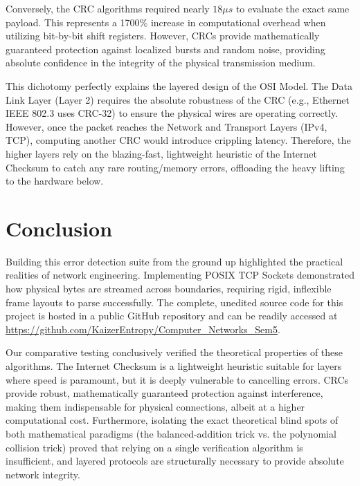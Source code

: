 \documentclass[12pt, a4paper]{article}
\begin{document}
Conversely, the CRC algorithms required nearly $18 \mu s$ to evaluate the exact same payload. This represents a 1700\% increase in computational overhead when utilizing bit-by-bit shift registers. However, CRCs provide mathematically guaranteed protection against localized bursts and random noise, providing absolute confidence in the integrity of the physical transmission medium. 

This dichotomy perfectly explains the layered design of the OSI Model. The Data Link Layer (Layer 2) requires the absolute robustness of the CRC (e.g., Ethernet IEEE 802.3 uses CRC-32) to ensure the physical wires are operating correctly. However, once the packet reaches the Network and Transport Layers (IPv4, TCP), computing another CRC would introduce crippling latency. Therefore, the higher layers rely on the blazing-fast, lightweight heuristic of the Internet Checksum to catch any rare routing/memory errors, offloading the heavy lifting to the hardware below.

\section{Conclusion}
Building this error detection suite from the ground up highlighted the practical realities of network engineering. Implementing POSIX TCP Sockets demonstrated how physical bytes are streamed across boundaries, requiring rigid, inflexible frame layouts to parse successfully. The complete, unedited source code for this project is hosted in a public GitHub repository and can be readily accessed at \url{https://github.com/KaizerEntropy/Computer_Networks_Sem5}.

Our comparative testing conclusively verified the theoretical properties of these algorithms. The Internet Checksum is a lightweight heuristic suitable for layers where speed is paramount, but it is deeply vulnerable to cancelling errors. CRCs provide robust, mathematically guaranteed protection against interference, making them indispensable for physical connections, albeit at a higher computational cost. Furthermore, isolating the exact theoretical blind spots of both mathematical paradigms (the balanced-addition trick vs. the polynomial collision trick) proved that relying on a single verification algorithm is insufficient, and layered protocols are structurally necessary to provide absolute network integrity.
\end{document}
